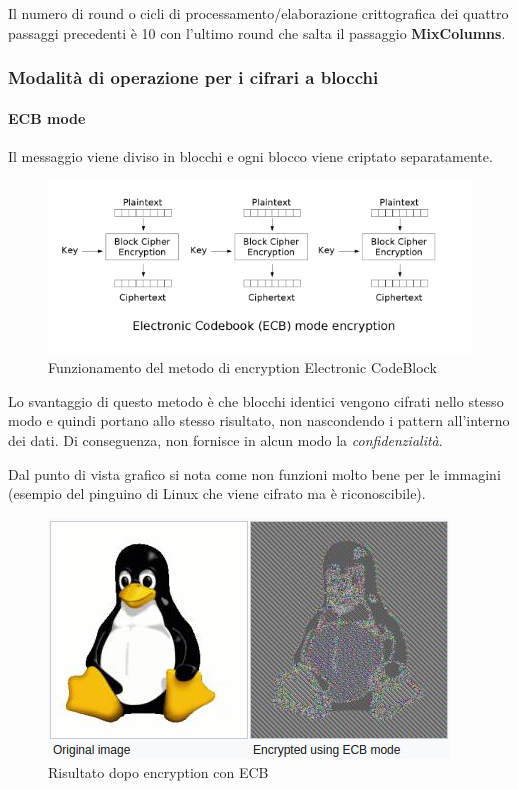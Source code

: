 Il numero di round o cicli di processamento/elaborazione crittografica dei quattro passaggi precedenti è 10 con l'ultimo round che salta il passaggio \textbf{MixColumns}.

\subsubsection{Modalità di operazione per i cifrari a blocchi}

\paragraph{ECB mode}

Il messaggio viene diviso in blocchi e ogni blocco viene criptato separatamente.

\begin{figure}[H]
\centering
\includegraphics[scale=0.65]{res/img/ecb.png}
\caption{Funzionamento del metodo di encryption Electronic CodeBlock}
\label{fig:password:ecb}
\end{figure}

Lo svantaggio di questo metodo è che blocchi identici vengono cifrati nello
stesso modo e quindi portano allo stesso risultato, non nascondendo i pattern
all'interno dei dati. Di conseguenza, non fornisce in alcun modo la
\textit{confidenzialità}.

Dal punto di vista grafico si nota come non funzioni molto bene per le
immagini (esempio del pinguino di Linux che viene cifrato ma è riconoscibile).

\begin{figure}[H]
\centering
\includegraphics[scale=0.65]{res/img/password_linux.png}
\caption{Risultato dopo encryption con ECB}
\label{fig:password:linux_ecb}
\end{figure}

